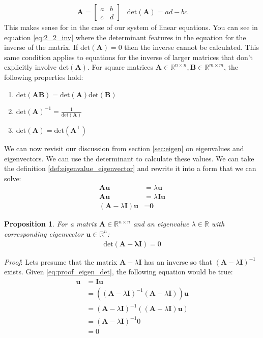\documentclass[a4paper,12pt]{book}
\newcommand{\matrx}[1]{\bm{#1}}
\newcommand{\vectr}[1]{\textbf{#1}}
\newcommand{\real}{\mathbb{R}}
\newcommand{\italic}[1]{\textit{#1}}
\newcommand{\dett}[1]{\text{det}(\matrx{#1})}
\newtheorem{proposition}{Proposition}[section]
\begin{document}
	\begin{align}
		\matrx{A} = \begin{bmatrix}
			a & b \\
			c & d
		\end{bmatrix}
		\hspace{10pt}
		\dett{A} = ad - bc
	\end{align}
	This makes sense for in the case of our system of linear equations. You can see in equation \ref{eq:2_2_inv} where the determinant features in the equation for the inverse of the matrix. If $ \dett{A} = 0$ then the inverse cannot be calculated. This same condition applies to equations for the inverse of larger matrices that don't explicitly involve $ \dett{A} $. For square matrices $ \matrx{A} \in \real^{n \times n}, \matrx{B} \in \real^{m \times m} $, the following properties hold:
	\begin{enumerate}
		\item $ \dett{AB} = \dett{A}\dett{B} $
		\item $ \dett{A}^{-1} = \frac{1}{\dett{A}} $
		\item $ \dett{A} = \dett{A^{\top}}$
	\end{enumerate}
	We can now revisit our discussion from section \ref{sec:eigen} on eigenvalues and eigenvectors. We can use the determinant to calculate these values. We can take the definition \ref{def:eigenvalue_eigenvector} and rewrite it into a form that we can solve:
	\begin{align}
		\matrx{A} \vectr{u} &= \lambda \vectr{u} \\
		\matrx{A} \vectr{u} &= \lambda \matrx{I} \vectr{u} \\
		(\matrx{A} - \lambda \matrx{I}) \vectr{u} &= \vectr{0} 
		\label{eq:proof_eigen_det}
	\end{align}
	\begin{proposition}
		\normalfont For a matrix $ \matrx{A} \in \real^{n \times n} $ and an eigenvalue $ \lambda \in \real $ with corresponding eigenvector $ \vectr{u} \in \real^{n} $: 
		\begin{align}
			\dett{\matrx{A} - \lambda \matrx{I}} = 0
		\end{align}
		\label{prop:det_eigen_eq}
	\end{proposition} 
	\italic{Proof}: Lets presume that the matrix $ \matrx{A} - \lambda \matrx{I} $ has an inverse so that $ (\matrx{A} - \lambda \matrx{I})^{-1} $ exists. Given \ref{eq:proof_eigen_det}, the following equation would be true: 
	\begin{align}
		\vectr{u} &= \matrx{I} \vectr{u} \\
		&= ((\matrx{A} - \lambda \matrx{I})^{-1} (\matrx{A} - \lambda \matrx{I})) \vectr{u} \\
		&= (\matrx{A} - \lambda \matrx{I})^{-1} ((\matrx{A} - \lambda \matrx{I}) \vectr{u}) \\
		&= (\matrx{A} - \lambda \matrx{I})^{-1} 0 \\
		&= 0
	\end{align}
\end{document}
